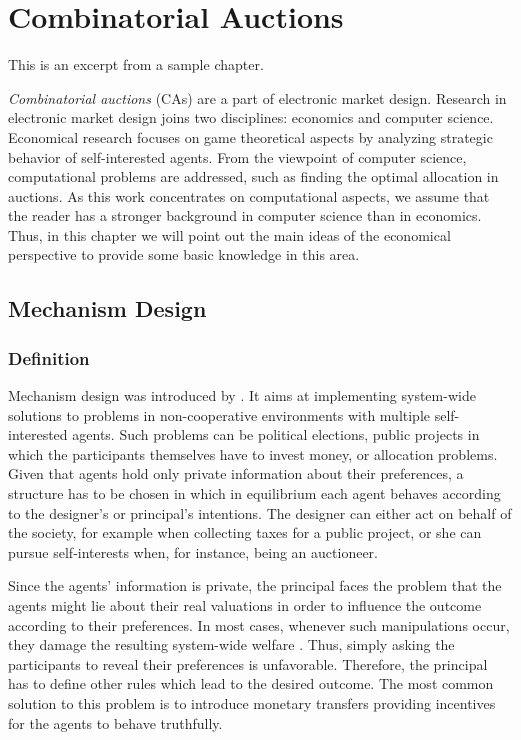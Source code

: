 \section{Combinatorial Auctions}
\label{chap:combinatorialAuctions}

This is an excerpt from a sample chapter.

\emph{Combinatorial auctions} (CAs) are a part of electronic
market design. Research in electronic market design joins two
disciplines: economics and computer science. Economical research
focuses on game theoretical aspects by analyzing strategic
behavior of self-interested agents. From the viewpoint of computer
science, computational problems are addressed, such as finding the
optimal allocation in auctions. As this work concentrates on
computational aspects, we assume that the reader has a stronger
background in computer science than in economics. Thus, in this
chapter we will point out the main ideas of the economical
perspective to provide some basic knowledge in this area.

\subsection{Mechanism Design}
\subsubsection{Definition}
Mechanism design was introduced by \textcite{Knapp.2011}. It
aims at implementing system-wide solutions to problems in
non-cooperative environments with multiple self-interested agents.
Such problems can be political elections, public projects in which
the participants themselves have to invest money, or allocation
problems. Given that agents hold only private information about
their preferences, a structure has to be chosen in which in
equilibrium each agent behaves according to the designer's or principal's
intentions. The designer can either act on behalf of the society, for
example when collecting taxes for a public project, or she can
pursue self-interests when, for instance, being an auctioneer.

Since the agents' information is private, the principal faces the
problem that the agents might lie about their real valuations in
order to influence the outcome according to their preferences. In
most cases, whenever such manipulations occur, they damage the
resulting system-wide welfare \parencite{Grant.2011}. Thus, simply asking
the participants to reveal their preferences is unfavorable.
Therefore, the principal has to define other rules which lead to
the desired outcome. The most common solution to this problem is
to introduce monetary transfers providing incentives for the
agents to behave truthfully.

